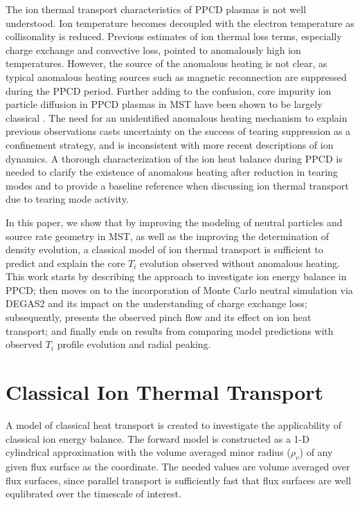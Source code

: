\documentclass[aip, pop, preprint]{revtex4-1}
\begin{document}
The ion thermal transport characteristics of PPCD plasmas is not well understood.
Ion temperature becomes decoupled with the electron temperature as
collisonality is reduced. Previous estimates of ion thermal loss terms,
especially charge exchange and convective loss, pointed to anomalously high ion
temperatures\cite{Fiksel2006,BiewerThesis,Wyman2007}.
However, the source of the anomalous heating is not clear, as typical anomalous heating 
sources such as magnetic reconnection are suppressed during the PPCD period.
Further adding to the confusion, core impurity ion particle diffusion in PPCD
plasmas in MST have been shown to be largely classical \cite{Kumar2012}. The
need for an unidentified anomalous heating mechanism to explain previous observations casts uncertainty on the success of
tearing suppression as a confinement strategy, and is inconsistent with more recent descriptions of ion dynamics.
A thorough characterization of the ion heat balance during PPCD is needed to clarify the existence of anomalous heating after reduction in tearing modes and to provide a baseline reference when discussing ion thermal transport due to tearing mode activity. 



In this paper, we show that by improving the modeling of neutral particles and source rate geometry in
MST, as well as the improving the determination of density evolution,
a classical model of ion thermal transport is sufficient
to predict and explain the core $T_i$ evolution observed without anomalous heating. 
This work starts by describing the approach to investigate ion energy balance in PPCD; then moves
on to the incorporation of Monte Carlo neutral simulation via DEGAS2 and its
impact on the understanding of charge exchange loss; subsequently, presents the
observed pinch flow and its effect on ion heat transport; and finally ends
on results from comparing model predictions with observed $T_{i}$ profile
evolution and radial peaking.

\section{Classical Ion Thermal Transport}

A model of classical heat transport is created to investigate the applicability
of classical ion energy balance. 
The forward model is constructed as a 1-D cylindrical approximation with the
volume averaged minor radius ($ \rho_v $) of any given flux surface as the
coordinate. The needed values are volume averaged over flux surfaces, since
parallel transport is sufficiently fast that flux surfaces are well equlibrated over the timescale of interest.
\end{document}
